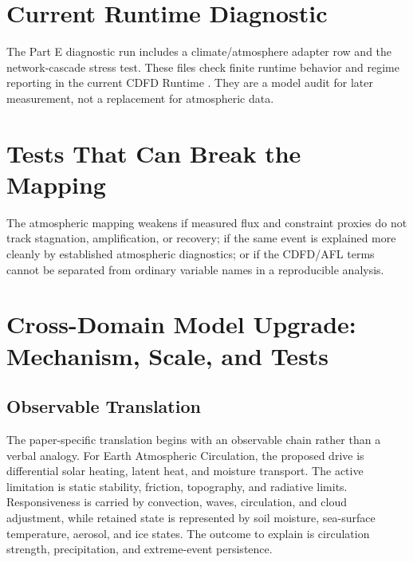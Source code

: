 \documentclass[12pt,a4paper]{article}
\begin{document}
\section{Current Runtime Diagnostic}

The Part E diagnostic run includes a climate/atmosphere adapter row and the
network-cascade stress test. These files check finite runtime behavior and
regime reporting in the current CDFD Runtime \cite{CDFDRuntime2026}. They are a
model audit for later measurement, not a replacement for atmospheric data.

\section{Tests That Can Break the Mapping}

The atmospheric mapping weakens if measured flux and constraint proxies do not
track stagnation, amplification, or recovery; if the same event is explained
more cleanly by established atmospheric diagnostics; or if the CDFD/AFL terms
cannot be separated from ordinary variable names in a reproducible analysis.

\section{Cross-Domain Model Upgrade: Mechanism, Scale, and Tests}

\subsection{Observable Translation}

The paper-specific translation begins with an observable chain rather than a
verbal analogy. For Earth Atmospheric Circulation, the proposed drive is differential solar heating, latent heat, and moisture transport.
The active limitation is static stability, friction, topography, and radiative limits. Responsiveness is carried by
convection, waves, circulation, and cloud adjustment, while retained state is represented by
soil moisture, sea-surface temperature, aerosol, and ice states. The outcome to explain is circulation strength, precipitation, and extreme-event persistence.
\end{document}
